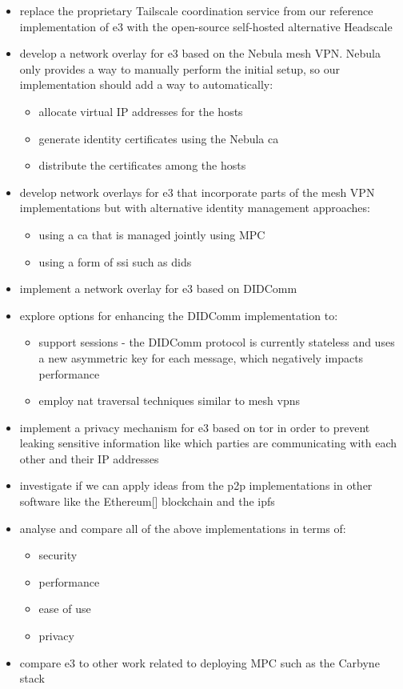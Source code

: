 \begin{itemize}
\tightlist
\item
  replace the proprietary Tailscale coordination service from our
  reference implementation of \gls{e3} with the open-source self-hosted
  alternative Headscale\autocite{fontJuanfontHeadscale2022}
\item
  develop a network overlay for \gls{e3} based on the Nebula mesh VPN.
  Nebula only provides a way to manually perform the initial setup, so
  our implementation should add a way to automatically:

  \begin{itemize}
  \tightlist
  \item
    allocate virtual IP addresses for the hosts
  \item
    generate identity certificates using the Nebula \gls{ca}
  \item
    distribute the certificates among the hosts
  \end{itemize}
\item
  develop network overlays for \gls{e3} that incorporate parts of the
  mesh VPN implementations but with alternative identity management
  approaches:

  \begin{itemize}
  \tightlist
  \item
    using a \gls{ca} that is managed jointly using MPC
  \item
    using a form of \gls{ssi} such as \glspl{did}
  \end{itemize}
\item
  implement a network overlay for \gls{e3} based on DIDComm
\item
  explore options for enhancing the DIDComm implementation to:

  \begin{itemize}
  \tightlist
  \item
    support sessions - the DIDComm protocol is currently stateless and
    uses a new asymmetric key for each message, which negatively impacts
    performance
  \item
    employ \gls{nat} traversal techniques similar to mesh \glspl{vpn}
  \end{itemize}
\item
  implement a privacy mechanism for \gls{e3} based on \gls{tor} in order
  to prevent leaking sensitive information like which parties are
  communicating with each other and their IP addresses
\item
  investigate if we can apply ideas from the \gls{p2p} implementations
  in other software like the
  Ethereum{[}\textcite{ethereumDocs}{]}\autocite{ethereumYellowPaper}
  blockchain and the \gls{ipfs} \autocite{ipfsDocs}
\item
  analyse and compare all of the above implementations in terms of:

  \begin{itemize}
  \tightlist
  \item
    security
  \item
    performance
  \item
    ease of use
  \item
    privacy
  \end{itemize}
\item
  compare \gls{e3} to other work related to deploying MPC such as the
  Carbyne stack\autocite{robertboschgmbhCarbyneStack2022}
\end{itemize}
